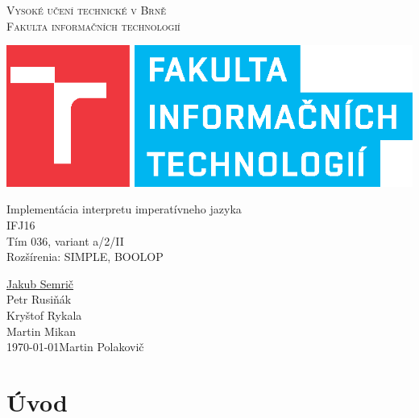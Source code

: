 \documentclass[11pt,a4paper]{article}
\begin{document}
	
	\renewcommand{\refname}{}
	\begin{titlepage}
		\begin{center}
			\textsc{\Huge Vysoké učení technické v Brně\\ \medskip
				\huge Fakulta informačních technologií}\\[30mm]
			
			\begin{center}
				\scalebox{1} {\includegraphics{fit_logo.eps}}
			\end{center}
			
			\Huge{Implementácia interpretu imperatívneho jazyka}\\[4mm]
			\Huge{IFJ16}\\[2mm]
			\LARGE{Tím 036, variant a/2/II}\\
			\LARGE{Rozšírenia: SIMPLE, BOOLOP}\\
			
			
			\begin{flushright}
				\noindent \underline{Jakub Semrič}\\
				Petr Rusiňák\\
				Kryštof Rykala\\
				Martin Mikan\\
				\today \hfill         Martin Polakovič \newpage
			\end{flushright}
			
		\end{center}
		
		\pagebreak
		\thispagestyle{empty}
		\tableofcontents
		\pagebreak
		
	\end{titlepage}
	\newpage
	
	\section{Úvod}
	
\end{document}
